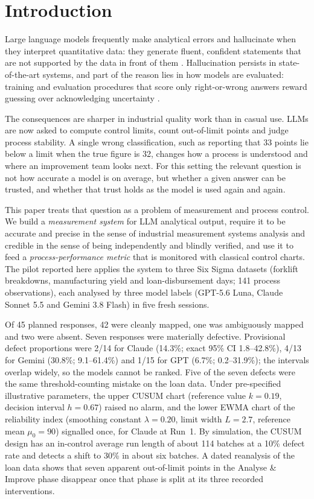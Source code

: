 \documentclass[11pt]{article}
\begin{document}
\section{Introduction}
Large language models frequently make analytical errors and hallucinate when they interpret quantitative data: they generate fluent, confident statements that are not supported by the data in front of them \citep{ji2023hallucination,huang2025survey}. Hallucination persists in state-of-the-art systems, and part of the reason lies in how models are evaluated: training and evaluation procedures that score only right-or-wrong answers reward guessing over acknowledging uncertainty \citep{kalai2025why}.

The consequences are sharper in industrial quality work than in casual use. LLMs are now asked to compute control limits, count out-of-limit points and judge process stability. A single wrong classification, such as reporting that 33 points lie below a limit when the true figure is 32, changes how a process is understood and where an improvement team looks next. For this setting the relevant question is not how accurate a model is on average, but whether a given answer can be trusted, and whether that trust holds as the model is used again and again.

This paper treats that question as a problem of measurement and process control. We build a \emph{measurement system} for LLM analytical output, require it to be accurate and precise in the sense of industrial measurement systems analysis and credible in the sense of being independently and blindly verified, and use it to feed a \emph{process-performance metric} that is monitored with classical control charts. The pilot reported here applies the system to three Six Sigma datasets (forklift breakdowns, manufacturing yield and loan-disbursement days; 141 process observations), each analysed by three model labels (GPT-5.6 Luna, Claude Sonnet 5.5 and Gemini 3.8 Flash) in five fresh sessions.

Of 45 planned responses, 42 were cleanly mapped, one was ambiguously mapped and two were absent. Seven responses were materially defective. Provisional defect proportions were 2/14 for Claude (14.3\%; exact 95\% CI 1.8--42.8\%), 4/13 for Gemini (30.8\%; 9.1--61.4\%) and 1/15 for GPT (6.7\%; 0.2--31.9\%); the intervals overlap widely, so the models cannot be ranked. Five of the seven defects were the same threshold-counting mistake on the loan data. Under pre-specified illustrative parameters, the upper CUSUM chart (reference value $k=0.19$, decision interval $h=0.67$) raised no alarm, and the lower EWMA chart of the reliability index (smoothing constant $\lambda=0.20$, limit width $L=2.7$, reference mean $\mu_0=90$) signalled once, for Claude at Run~1. By simulation, the CUSUM design has an in-control average run length of about 114 batches at a 10\% defect rate and detects a shift to 30\% in about six batches. A dated reanalysis of the loan data shows that seven apparent out-of-limit points in the Analyse \& Improve phase disappear once that phase is split at its three recorded interventions.
\end{document}
